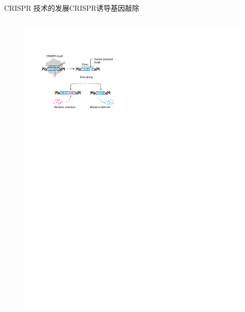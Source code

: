 \documentclass{beamer}
\begin{document}
\begin{frame}{CRISPR 技术的发展}{CRISPR诱导基因敲除}
\begin{columns}
			\begin{figure}
				\centering
				\includegraphics[width=\textwidth]{img/gene_knockout.pdf}
			\end{figure}

		\end{columns}
	\end{frame}

\end{document}
